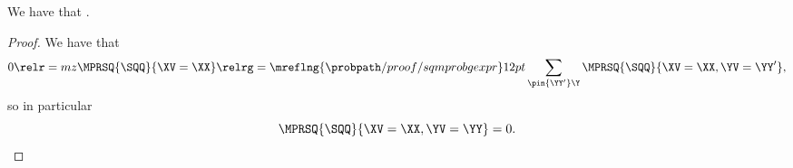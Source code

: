 \begin{proposition}
  We have that \sqpmargzimplprop.%
\end{proposition}

\begin{proof}
  We have that
  $$0 \relr = mz \MPRSQ{\SQQ}{\XV = \XX} \relrg = {\mreflng{\probpath/proof/sqmprobgexpr}} 12pt \sum_{\pin{\YY'}\Y} \MPRSQ{\SQQ}{\XV = \XX, \YV = \YY'},$$%
  so in particular 
  $$\MPRSQ{\SQQ}{\XV = \XX, \YV = \YY} = 0.$$%
\end{proof}
